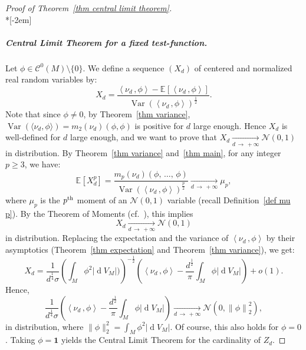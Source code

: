 \documentclass[AHL,Unicode,longabstracts,published]{cedram}
\DeclareMathOperator{\dmesure}{d}
\DeclareMathOperator{\Var}{Var}
\newcommand{\clN}{\mathcal{N}}
\newcommand{\clC}{\mathcal{C}}
\newcommand{\bfun}{\mathbf{1}}
\newcommand{\esp}[2][]{\mathbb{E}_{#1}\!\left[#2 \right]}
\newcommand{\norm}[1]{\left\lvert #1 \right\rvert}
\newcommand{\Norm}[1]{\left\lVert #1 \right\rVert}
\newcommand{\prsc}[2]{\left\langle #1\,, #2 \right\rangle}
\newcommand{\rmes}[1]{\norm{\dmesure\! V_{#1}}}
\newcommand{\var}[1]{\Var\!\left(#1 \right)}
\renewcommand{\geq}{\geqslant}
\begin{document}
\begin{proof}[{Proof of Theorem~\ref{thm central limit theorem}}]\ \\*[-2em]
\subparagraph*{Central Limit Theorem for a fixed test-function.} Let $\phi \in \clC^0(M)\setminus \{0\}$. We define a sequence $(X_d)$ of centered and normalized real random variables by:
\[
X_d = \frac{\prsc{\nu_d}{\phi} - \esp{\prsc{\nu_d}{\phi}}}{\var{\prsc{\nu_d}{\phi}}^\frac{1}{2}}.
\]
Note that since $\phi \neq 0$, by Theorem~\ref{thm variance}, $\Var(\langle\nu_d,\phi\rangle) = m_2(\nu_d)(\phi,\phi)$ is positive for $d$ large enough. Hence $X_d$ is well-defined for $d$ large enough, and we want to prove that $X_d \xrightarrow[d \,\to\,+\infty]{} \clN(0,1)$ in distribution. By Theorem~\ref{thm variance} and~\ref{thm main}, for any integer $p \geq 3$, we have:
\[
\esp{X_d^p} = \frac{m_p(\nu_d)(\phi,\,\dots,\,\phi)}{\var{\prsc{\nu_d}{\phi}}^\frac{p}{2}} \xrightarrow[d\,\to\,+\infty]{} \mu_p,
\]
where $\mu_p$ is the $p^{\rm th}$ moment of an $\clN(0,1)$ variable (recall Definition~\ref{def mu p}). By the Theorem of Moments (cf.~\cite[Theorem~30.2]{Bil1995}), this implies
\[
X_d \xrightarrow[d\,\to\,+\infty]{}\clN(0,1)
\]
in distribution. Replacing the expectation and the variance of $\prsc{\nu_d}{\phi}$ by their asymptotics (Theorem~\ref{thm expectation} and Theorem~\ref{thm variance}), we get:
\[
X_d = \frac{1}{d^\frac{1}{4}\sigma} \left(\int_M \phi^2 \rmes{M})\right)^{-\frac{1}{2}} \left(\prsc{\nu_d}{\phi}- \frac{d^\frac{1}{2}}{\pi} \int_M \phi \rmes{M}\right) +o(1).
\]
Hence,
\[
\frac{1}{d^\frac{1}{4}\sigma} \left(\prsc{\nu_d}{\phi}- \frac{d^\frac{1}{2}}{\pi} \int_M \phi \rmes{M}\right) \xrightarrow[d\,\to\,+\infty]{} \clN(0,\Norm{\phi}^2_2),
\]
in distribution, where $\|\phi\|_2^2 = \int_M \phi^2 \rmes{M}$. Of course, this also holds for $\phi=0$. Taking $\phi = \bfun$ yields the Central Limit Theorem for the cardinality of $Z_d$.


\end{proof}
\end{document}
